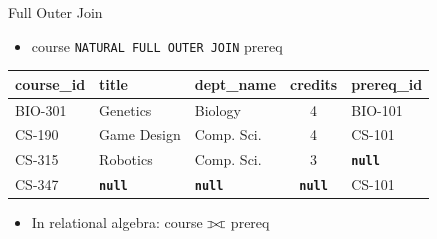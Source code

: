 \documentclass{beamer}
\def\ojoin{\setbox0=\hbox{$\bowtie$}%
  \rule[-.02ex]{.25em}{.4pt}\llap{\rule[\ht0]{.25em}{.4pt}}}
\def\fullouterjoin{\mathbin{\ojoin\mkern-5.8mu\bowtie\mkern-5.8mu\ojoin}}
\begin{document}
\begin{frame}{Full Outer Join}
    \begin{itemize}
        \item course \texttt{NATURAL FULL OUTER JOIN} prereq
    \end{itemize}
    \vspace{5mm}
    \begin{tabular}{| l | l | l | c | l |}
        \hline
        \textbf{course\_id} & \textbf{title} & \textbf{dept\_name} & \textbf{credits} & \textbf{prereq\_id} \\
        \hline
        BIO-301 & Genetics    & Biology    & 4 & BIO-101 \\
        \hline
        CS-190  & Game Design & Comp. Sci. & 4 & CS-101  \\
        \hline
        CS-315  & Robotics    & Comp. Sci. & 3 & \textbf{\texttt{null}}\\
        \hline
        CS-347  & \textbf{\texttt{null}}   & \textbf{\texttt{null}} & \textbf{\texttt{null}} & CS-101 \\
        \hline
    \end{tabular}
    \vspace{5mm}
    \begin{itemize}
        \item In relational algebra: course $\fullouterjoin$ prereq
    \end{itemize}
\end{frame}
\end{document}
